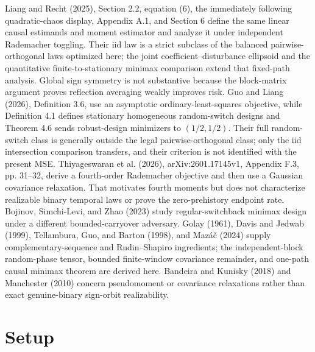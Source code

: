 \documentclass{article}
\begin{document}
Liang and Recht (2025), Section 2.2, equation (6), the immediately following quadratic-chaos display, Appendix A.1, and Section 6 define the same linear causal estimands and moment estimator and analyze it under independent Rademacher toggling. Their iid law is a strict subclass of the balanced pairwise-orthogonal laws optimized here; the joint coefficient--disturbance ellipsoid and the quantitative finite-to-stationary minimax comparison extend that fixed-path analysis. Global sign symmetry is not substantive because the block-matrix argument proves reflection averaging weakly improves risk. Guo and Liang (2026), Definition 3.6, use an asymptotic ordinary-least-squares objective, while Definition 4.1 defines stationary homogeneous random-switch designs and Theorem 4.6 sends robust-design minimizers to \((1/2,1/2)\). Their full random-switch class is generally outside the legal pairwise-orthogonal class; only the iid intersection comparison transfers, and their criterion is not identified with the present MSE. Thiyageswaran et al. (2026), arXiv:2601.17145v1, Appendix F.3, pp. 31--32, derive a fourth-order Rademacher objective and then use a Gaussian covariance relaxation. That motivates fourth moments but does not characterize realizable binary temporal laws or prove the zero-prehistory endpoint rate. Bojinov, Simchi-Levi, and Zhao (2023) study regular-switchback minimax design under a different bounded-carryover adversary. Golay (1961), Davis and Jedwab (1999), Tellambura, Guo, and Barton (1998), and Mazáč (2024) supply complementary-sequence and Rudin--Shapiro ingredients; the independent-block random-phase tensor, bounded finite-window covariance remainder, and one-path causal minimax theorem are derived here. Bandeira and Kunisky (2018) and Manchester (2010) concern pseudomoment or covariance relaxations rather than exact genuine-binary sign-orbit realizability.

\section{Setup}
\end{document}
